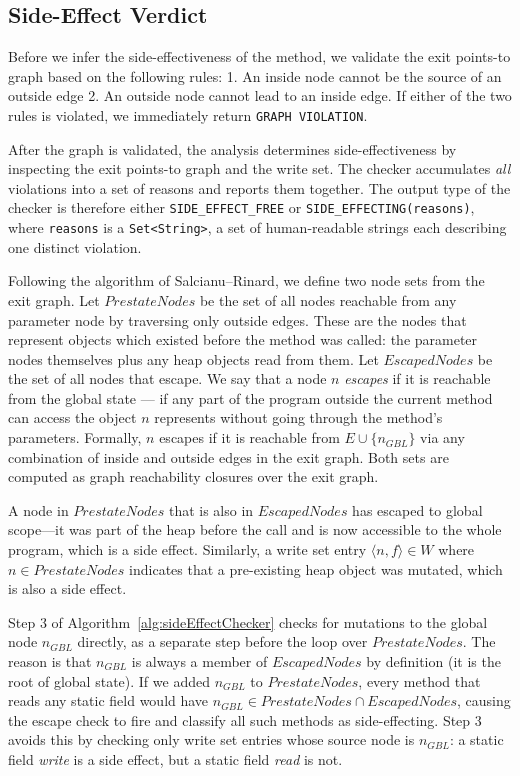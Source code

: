 \subsection{Side-Effect Verdict} \label{sec:side-effect-verdict}
Before we infer the side-effectiveness of the method, we validate the exit points-to graph based on the following rules:
1. An inside node cannot be the source of an outside edge
2. An outside node cannot lead to an inside edge.
If either of the two rules is violated, we immediately return \texttt{GRAPH VIOLATION}.

After the graph is validated, the analysis determines side-effectiveness by inspecting the exit points-to graph and the write set. The checker accumulates \emph{all} violations into a set of reasons and reports them together. The output type of the checker is therefore either \texttt{SIDE\_EFFECT\_FREE} or \texttt{SIDE\_EFFECTING(reasons)}, where \texttt{reasons} is a \texttt{Set<String>}, a set of human-readable strings each describing one distinct violation. 


Following the algorithm of Salcianu--Rinard, we define two node sets from the exit graph. Let $\mathit{PrestateNodes}$ be the set of all nodes reachable from any parameter node by traversing only outside edges. These are the nodes that represent objects which existed before the method was called: the parameter nodes themselves plus any heap objects read from them. Let $\mathit{EscapedNodes}$ be the set of all nodes that escape. We say that a node $n$ \emph{escapes} if it is reachable from the global state --- if any part of the program outside the current method can access the object $n$ represents without going through the method's parameters. Formally, $n$ escapes if it is reachable from $E \cup \{n_{GBL}\}$ via any combination of inside and outside edges in the exit graph. Both sets are computed as graph reachability closures over the exit graph.

A node in $\mathit{PrestateNodes}$ that is also in $\mathit{EscapedNodes}$ has escaped to global scope---it was part of the heap before the call and is now accessible to the whole program, which is a side effect. Similarly, a write set entry $\langle n, f \rangle \in W$ where $n \in \mathit{PrestateNodes}$ indicates that a pre-existing heap object was mutated, which is also a side effect.

Step 3 of Algorithm~\ref{alg:sideEffectChecker} checks for mutations to the global node $n_{GBL}$ directly, as a separate step before the loop over $\mathit{PrestateNodes}$. The reason is that $n_{GBL}$ is always a member of $\mathit{EscapedNodes}$ by definition (it is the root of global state). If we added $n_{GBL}$ to $\mathit{PrestateNodes}$, every method that reads any static field would have $n_{GBL} \in \mathit{PrestateNodes} \cap \mathit{EscapedNodes}$, causing the escape check to fire and classify all such methods as side-effecting. Step 3 avoids this by checking only write set entries whose source node is $n_{GBL}$: a static field \emph{write} is a side effect, but a static field \emph{read} is not.

